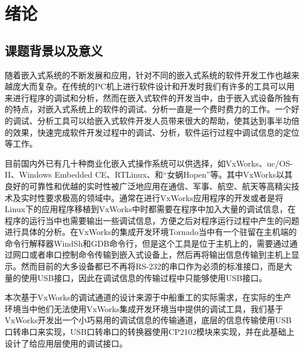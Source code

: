 \chapter{绪论}
\section{课题背景以及意义}
	随着嵌入式系统的不断发展和应用，针对不同的嵌入式系统的软件开发工作也越来越庞大而复杂。在传统的PC机上进行软件设计和开发时我们有许多的工具可以用来进行程序的调试和分析，然而在嵌入式软件的开发当中，由于嵌入式设备所独有的特点，对嵌入式系统上的软件的调试、分析一直是一个费时费力的工作。一个好的调试、分析工具可以给嵌入式软件开发人员带来很大的帮助，使其达到事半功倍的效果，快速完成软件开发过程中的调试、分析，软件运行过程中调试信息的定位等工作。
		
	目前国内外已有几十种商业化嵌入式操作系统可以供选择，如VxWorks、uc/OS-II、Windows Embedded CE、RTLinux、和“女蜗Hopen”等。其中VxWorks以其良好的可靠性和优越的实时性被广泛地应用在通信、军事、航空、航天等高精尖技术及实时性要求极高的领域中\cite{张鹏2007基于}。通常在进行VxWorks应用程序的开发或者是将Linux下的应用程序移植到VxWorks中时都需要在程序中加入大量的调试信息，在程序的运行当中也需要输出一些调试信息，方便之后对程序运行过程中产生的问题进行具体的分析。在VxWorks的集成开发环境Tornado当中有一个驻留在主机端的命令行解释器WindSh和GDB命令行，但是这个工具是位于主机上的，需要通过通过网口或者串口控制命令传输到嵌入式设备上，然后再将输出信息传输到主机上显示。然而目前的大多设备都已不再将RS-232的串口作为必须的标准接口，而是大量的使用USB接口，因此在调试信息的传输过程中只能够使用USB接口。
	
	
	本次基于VxWorks的调试通道的设计来源于中船重工的实际需求，在实际的生产环境当中他们无法使用VxWorks集成开发环境当中提供的调试工具，我们基于VxWorks开发出一个小巧易用的调试信息的传输通道，底层的信息传输使用USB口转串口来实现，USB口转串口的转换器使用CP2102模块来实现，并在此基础上设计了给应用层使用的调试接口。
	
		
			
